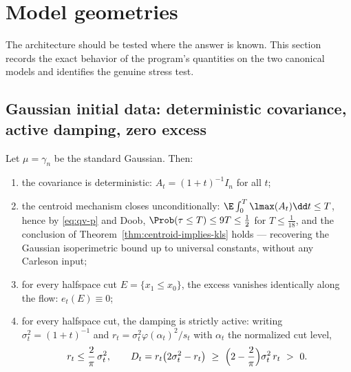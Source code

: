 \documentclass[../../main.tex]{subfiles}
\begin{document}
\section{Model geometries}
\label{sec:models}

The architecture should be tested where the answer is known. This section records the exact
behavior of the program's quantities on the two canonical models and identifies the genuine
stress test.

\subsection{Gaussian initial data: deterministic covariance, active damping, zero excess}

\begin{proposition}
\label{prop:gaussian-model}
Let $\mu=\gamma_n$ be the standard Gaussian. Then:
\begin{enumerate}[label=(\roman*),leftmargin=2.2em]
\item the covariance is deterministic: $A_t=(1+t)^{-1}I_n$ for all $t$;
\item the centroid mechanism closes unconditionally: $\E\int_0^T\lmax(A_t)\dd t\le T$, hence by
\eqref{eq:qv-p} and Doob, $\Prob(\tau\le T)\le9T\le\tfrac12$ for $T\le\tfrac1{18}$, and the
conclusion of Theorem~\ref{thm:centroid-implies-kls} holds --- recovering the Gaussian
isoperimetric bound up to universal constants, without any Carleson input;
\item for every halfspace cut $E=\{x_1\le x_0\}$, the excess vanishes identically along the
flow: $e_t(E)\equiv0$;
\item for every halfspace cut, the damping is strictly active: writing
$\sigma_t^2=(1+t)^{-1}$ and $r_t=\sigma_t^2\varphi(\alpha_t)^2/s_t$ with
$\alpha_t$ the normalized cut level,
\[
  r_t\le\frac2\pi\,\sigma_t^2,
  \qquad
  D_t=r_t\bigl(2\sigma_t^2-r_t\bigr)\ \ge\ \Bigl(2-\frac2\pi\Bigr)\sigma_t^2\,r_t\ >\ 0 .
\]
\end{enumerate}
\end{proposition}
\end{document}
